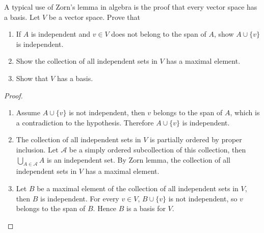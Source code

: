 \begin{exercise}\label{chapter1:section11:exercise8}
    A typical use of Zorn's lemma in algebra is the proof that every vector space has a basis. Let $V$ be a vector space. Prove that
    \begin{enumerate}[label={(\alph*)}]
        \item If $A$ is independent and $v\in V$ does not belong to the span of $A$, show $A\cup \{ v \}$ is independent.
        \item Show the collection of all independent sets in $V$ has a maximal element.
        \item Show that $V$ has a basis.
    \end{enumerate}
\end{exercise}

\begin{proof}
    \begin{enumerate}[label={(\alph*)}]
        \item Assume $A\cup \{ v \}$ is not independent, then $v$ belongs to the span of $A$, which is a contradiction to the hypothesis. Therefore $A\cup\{v \}$ is independent.
        \item The collection of all independent sets in $V$ is partially ordered by proper inclusion. Let $\mathscr{A}$ be a simply ordered subcollection of this collection, then $\bigcup_{A\in\mathscr{A}}A$ is an independent set. By Zorn lemma, the collection of all independent sets in $V$ has a maximal element.
        \item Let $B$ be a maximal element of the collection of all independent sets in $V$, then $B$ is independent. For every $v\in V$, $B\cup\{ v \}$ is not independent, so $v$ belongs to the span of $B$. Hence $B$ is a basis for $V$.
    \end{enumerate}
\end{proof}

